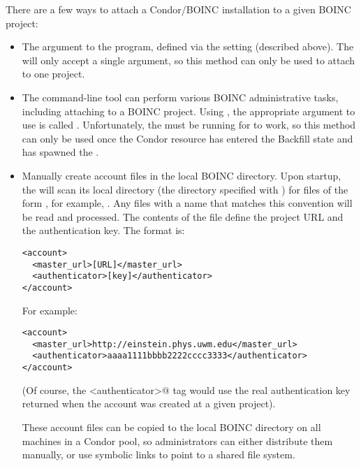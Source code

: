 There are a few ways to attach a Condor/BOINC installation to a given
BOINC project:
\begin{itemize}

\item The  argument to the 
  program, defined via the  setting
  (described above). 
  The  will only accept a single
   argument, so this method can only be used to
  attach to one project.

\item The  command-line tool can perform various
  BOINC administrative tasks, including attaching to a BOINC project.
  Using , the appropriate argument to use is called
  .
  Unfortunately, the  must be running for
   to work, so this method can only be used once the
  Condor resource has entered the Backfill state and has spawned the
  . 
  
\item Manually create account files in the local BOINC directory.
  Upon startup, the  will scan its local directory
  (the directory specified with )
  for files of the form , for example,
  . 
  Any files with a name that matches this convention will be read and
  processed.
  The contents of the file define the project URL and the
  authentication key.
  The format is:

\footnotesize
\begin{verbatim}
<account>
  <master_url>[URL]</master_url>
  <authenticator>[key]</authenticator>
</account>
\end{verbatim}
\normalsize

For example: 

\footnotesize
\begin{verbatim}
<account>
  <master_url>http://einstein.phys.uwm.edu</master_url>
  <authenticator>aaaa1111bbbb2222cccc3333</authenticator>
</account>
\end{verbatim}
\normalsize

(Of course, the \verb@<authenticator>@ tag would use the real
authentication key returned when the account was created at a given
project).

These account files can be copied to the local BOINC directory on all
machines in a Condor pool, so administrators can either distribute
them manually, or use symbolic links to point to a shared file
system. 

\end{itemize}

